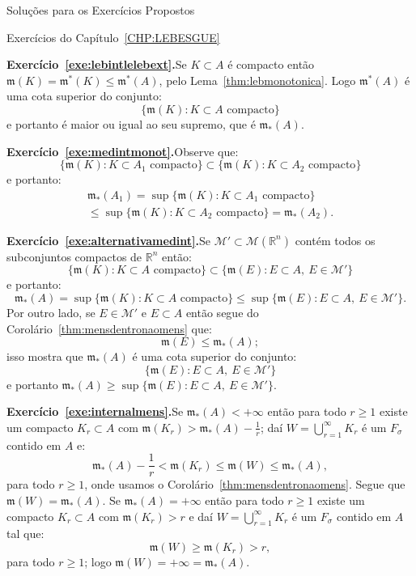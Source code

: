 \documentclass[oneside,final,11pt]{amsbook}
\newcommand{\R}{\mathds R}
\newcommand{\leb}{\mathfrak m}
\newcommand{\Lebmens}{\mathcal M}
\theoremstyle{remark}\newtheorem{exercise}{Exercício}[chapter]
\theoremstyle{remark}\newtheorem{*exercise}[exercise]{\hbox to 0pt{\hskip 0pt minus 1fil*}Exercício}
\theoremstyle{definition}\newtheorem{exdefin}{Definição}[chapter]
\theoremstyle{plain}\newtheorem{teo}{Teorema}[section]
\theoremstyle{plain}\newtheorem{lem}[teo]{Lema}
\theoremstyle{plain}\newtheorem{prop}[teo]{Proposição}
\theoremstyle{plain}\newtheorem{cor}[teo]{Corolário}
\theoremstyle{definition}\newtheorem{defin}[teo]{Definição}
\theoremstyle{remark}\newtheorem{rem}[teo]{Observação}
\theoremstyle{definition}\newtheorem{notation}[teo]{Notação}
\theoremstyle{definition}\newtheorem{convention}[teo]{Convenção}
\theoremstyle{definition}\newtheorem{example}[teo]{Exemplo}
\numberwithin{section}{chapter}
\numberwithin{equation}{section}
\begin{document}
\begin{chapter}{Soluções para os Exercícios Propostos}
\begin{section}{Exercícios do Capítulo~\ref{CHP:LEBESGUE}}
\medskip

\textbf{Exercício~\ref{exe:lebintlelebext}.}\enspace Se $K\subset A$ é compacto então
$\leb(K)=\leb^*(K)\le\leb^*(A)$, pelo Lema~\ref{thm:lebmonotonica}.
Logo $\leb^*(A)$ é uma cota superior do conjunto:
\[\big\{\leb(K):\text{$K\subset A$ compacto}\big\}\]
e portanto é maior ou igual ao seu supremo, que é $\leb_*(A)$.

\medskip

\textbf{Exercício~\ref{exe:medintmonot}.}\enspace Observe que:
\[\big\{\leb(K):\text{$K\subset A_1$ compacto}\big\}\subset
\big\{\leb(K):\text{$K\subset A_2$ compacto}\big\}\]
e portanto:
\begin{multline*}
\leb_*(A_1)=\sup\big\{\leb(K):\text{$K\subset A_1$ compacto}\big\}\\
\le\sup\big\{\leb(K):\text{$K\subset A_2$ compacto}\big\}=\leb_*(A_2).
\end{multline*}

\medskip

\textbf{Exercício~\ref{exe:alternativamedint}.}\enspace Se $\mathcal M'\subset\Lebmens(\R^n)$
contém todos os subconjuntos compactos de $\R^n$ então:
\[\big\{\leb(K):\text{$K\subset A$ compacto}\big\}\subset\big\{\leb(E):E\subset A,\ E\in\mathcal M'\big\}\]
e portanto:
\[\leb_*(A)=\sup\big\{\leb(K):\text{$K\subset A$ compacto}\big\}\le
\sup\big\{\leb(E):E\subset A,\ E\in\mathcal M'\big\}.\]
Por outro lado, se $E\in\mathcal M'$ e $E\subset A$ então segue do Corolário~\ref{thm:mensdentronaomens} que:
\[\leb(E)\le\leb_*(A);\]
isso mostra que $\leb_*(A)$ é uma cota superior do conjunto:
\[\big\{\leb(E):E\subset A,\ E\in\mathcal M'\big\}\]
e portanto $\leb_*(A)\ge\sup\big\{\leb(E):E\subset A,\ E\in\mathcal M'\big\}$.

\medskip

\textbf{Exercício~\ref{exe:internalmens}.}\enspace Se $\leb_*(A)<+\infty$ então
para todo $r\ge1$ existe um compacto $K_r\subset A$ com $\leb(K_r)>\leb_*(A)-\frac1r$;
daí $W=\bigcup_{r=1}^\infty K_r$ é um $F_\sigma$ contido em $A$ e:
\[\leb_*(A)-\frac1r<\leb(K_r)\le\leb(W)\le\leb_*(A),\]
para todo $r\ge1$, onde usamos o Corolário~\ref{thm:mensdentronaomens}.
Segue que $\leb(W)=\leb_*(A)$. Se $\leb_*(A)=+\infty$ então para todo $r\ge1$ existe um compacto
$K_r\subset A$ com $\leb(K_r)>r$ e daí $W=\bigcup_{r=1}^\infty K_r$ é um $F_\sigma$ contido em
$A$ tal que:
\[\leb(W)\ge\leb(K_r)>r,\]
para todo $r\ge1$; logo $\leb(W)=+\infty=\leb_*(A)$.

\medskip


\end{section}
\end{chapter}
\end{document}
